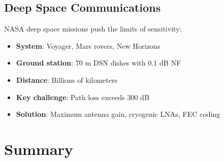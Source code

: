 \subsection{Deep Space Communications}

NASA deep space missions push the limits of sensitivity:
\begin{itemize}
\item \textbf{System}: Voyager, Mars rovers, New Horizons
\item \textbf{Ground station}: 70 m DSN dishes with $0.1$ dB NF
\item \textbf{Distance}: Billions of kilometers
\item \textbf{Key challenge}: Path loss exceeds 300 dB
\item \textbf{Solution}: Maximum antenna gain, cryogenic LNAs, FEC coding
\end{itemize}

\section{Summary}

